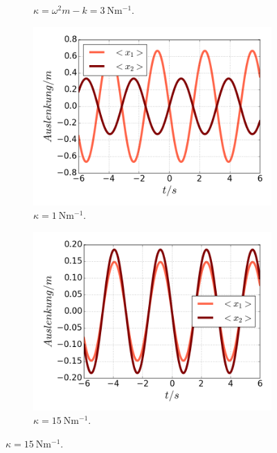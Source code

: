 \begin{figure}
\begin{subfigure}[t]{0.5\textwidth}
          \caption{$\kappa=\omega^2m-k=\SI{3}{\newton \meter^{-1}}$.}
          \label{fig:x1_null}
      \end{subfigure}
      \begin{subfigure}[t]{0.5\textwidth}
        \centering
        \includegraphics[width=\textwidth]{plots/<x12>nlschwach.png}
        \caption{$\kappa=\SI{1}{\newton \meter^{-1}}$.}
        \label{fig:schwach}
      \end{subfigure}
      \begin{subfigure}[t]{0.5\textwidth}
          \centering
          \includegraphics[width=\textwidth]{plots/<x12>nlstark.png}
          \caption{$\kappa=\SI{15}{\newton \meter^{-1}}$.}
          \label{fig:stark}

\end{subfigure}
\end{figure}
